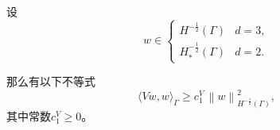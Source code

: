 \begin{theorem}
  \label{theorem:bvp-bie-vw-w-gamma}
  设
  \begin{equation*}
    w \in
    \begin{cases}
      H^{-\frac{1}{2}}(\Gamma) & d =3, \\
      H_{*}^{-\frac{1}{2}}(\Gamma) & d = 2.
    \end{cases}
  \end{equation*}

  那么有以下不等式
  \begin{equation}
    \label{eq:bvp-bie-vw-w-gamma}
    \langle V w, w \rangle_{\Gamma} \ge c_{1}^{V} \,
    \left\| w \right\|_{H^{-\frac{1}{2}}(\Gamma)}^{2},
  \end{equation}
  其中常数$c_{1}^{V} \ge 0$。
\end{theorem}
